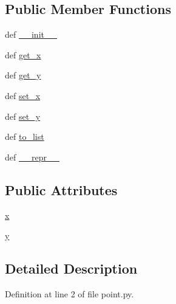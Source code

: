 \subsection*{Public Member Functions}
\begin{DoxyCompactItemize}
\item 
def \hyperlink{classlocaudio_1_1point_1_1Point_a623c5e1c413d4e9ad61a670df2df3c7d}{\-\_\-\-\_\-init\-\_\-\-\_\-}
\item 
def \hyperlink{classlocaudio_1_1point_1_1Point_aed3cdb69eb0947bd839a5f58658a4ec8}{get\-\_\-x}
\item 
def \hyperlink{classlocaudio_1_1point_1_1Point_abbb24f2a2b4a776a81c755044d3d3c1d}{get\-\_\-y}
\item 
def \hyperlink{classlocaudio_1_1point_1_1Point_a321adfaa5bbe604f7d95e8d3453728f5}{set\-\_\-x}
\item 
def \hyperlink{classlocaudio_1_1point_1_1Point_a09e41fa59a48f850881cd13f923324d3}{set\-\_\-y}
\item 
def \hyperlink{classlocaudio_1_1point_1_1Point_aa1ed49a30a5e6589c8752530f261f9dd}{to\-\_\-list}
\item 
def \hyperlink{classlocaudio_1_1point_1_1Point_afd4dda0197e7d2a6853238294cb4ce93}{\-\_\-\-\_\-repr\-\_\-\-\_\-}
\end{DoxyCompactItemize}
\subsection*{Public Attributes}
\begin{DoxyCompactItemize}
\item 
\hyperlink{classlocaudio_1_1point_1_1Point_a6ff592bd2d87595950205335419de676}{x}
\item 
\hyperlink{classlocaudio_1_1point_1_1Point_a714d448f12192ca6d947e7109fb8f538}{y}
\end{DoxyCompactItemize}


\subsection{Detailed Description}


Definition at line 2 of file point.\-py.



